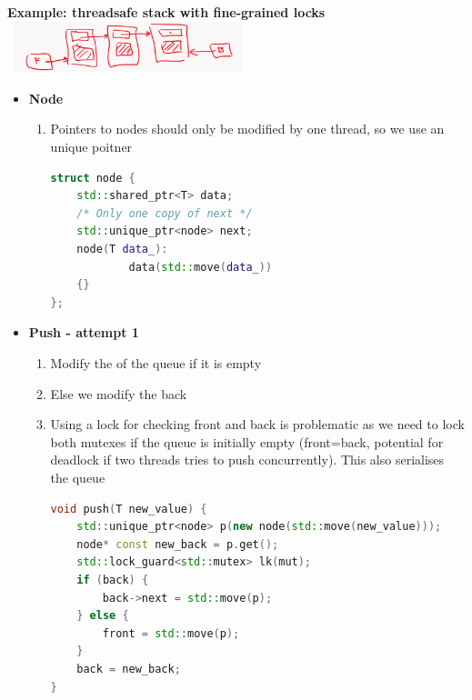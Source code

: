 \documentclass[10pt, landscape]{article}
\begin{document}
\begin{multicols}{4}
\textbf{Example: threadsafe stack with fine-grained locks} \\
\includegraphics*[width=7cm,height=1.5cm]{finegrained_queue.png}
\begin{itemize}
    \item \textbf{Node}
    \begin{enumerate}
        \item Pointers to nodes should only be modified by one thread, so we use an unique poitner 
        \begin{lstlisting}[language=C++, breaklines=true, breakatwhitespace=true]
struct node {
    std::shared_ptr<T> data;
    /* Only one copy of next */
    std::unique_ptr<node> next;
    node(T data_):
            data(std::move(data_))
    {}
};
        \end{lstlisting}
    \end{enumerate}
    \item \textbf{Push - attempt 1} \\
    \begin{enumerate}
        \item Modify the of the queue if it is empty
        \item Else we modify the back
        \item Using a lock for checking front and back is problematic as we need to lock both mutexes if the queue is initially empty (front=back, potential for deadlock if two threads tries to push concurrently). This also serialises the queue 
\begin{lstlisting}[language=C++, breaklines=true, breakatwhitespace=true]
void push(T new_value) {
    std::unique_ptr<node> p(new node(std::move(new_value)));
    node* const new_back = p.get();
    std::lock_guard<std::mutex> lk(mut);
    if (back) {
        back->next = std::move(p);
    } else {
        front = std::move(p);
    }
    back = new_back;
}
\end{lstlisting}
    \end{enumerate}


\end{itemize}
\end{multicols}
\end{document}
